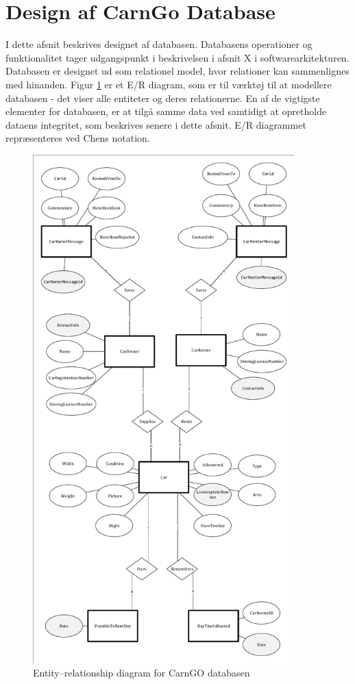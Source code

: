 \documentclass[SoftwareDesign/SoftwareDesign_main.tex]{subfiles}
\begin{document}
\section{Design af CarnGo Database}
I dette afsnit beskrives designet af databasen. Databasens operationer og funktionalitet tager udgangspunkt i beskrivelsen i afsnit X i softwarearkitekturen. Databasen er designet ud som relationel model, hvor relationer kan sammenlignes med hinanden. Figur \ref{fig:ERDiagram} er et E/R diagram, som er til værktøj til at modellere databasen - det viser alle entiteter og deres relationerne. En af de vigtigste elementer for databasen, er at tilgå samme data ved samtidigt at opretholde dataens integritet, som beskrives senere i dette afsnit. E/R diagrammet repræsenteres ved Chens notation. 
\begin{figure}[H]
    \centering
    \includegraphics[width=0.9\textwidth]{Arkitektur/Softwarearkitektur/Database/graphics/ER.pdf}
    \caption{Entity–relationship diagram for CarnGO databasen}
    \label{fig:ERDiagram}
\end{figure}
\end{document}
